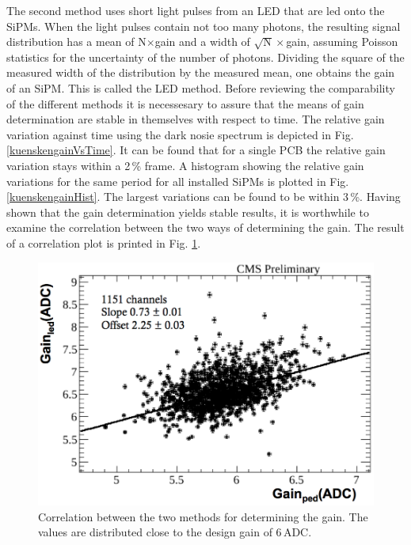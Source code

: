 The second method uses short light pulses from an LED that are led onto the SiPMs. When the light pulses contain not too many photons, the resulting signal distribution has a mean of N$\times$gain and a width of $\sqrt{\text{N}}\times$gain, assuming Poisson statistics for the uncertainty of the number of photons. Dividing the square of the measured width of the distribution by the measured mean, one obtains the gain of an SiPM. This is called the LED method.
Before reviewing the comparability of the different methods it is necessesary to assure that the means of gain determination are stable in themselves with respect to time. The relative gain variation against time using the dark nosie spectrum is depicted in Fig. \ref{kuenskengainVsTime}. It can be found that for a single PCB the relative gain variation stays within a 2\,\% frame. A histogram showing the relative gain variations for the same period for all installed SiPMs is plotted in Fig. \ref{kuenskengainHist}. The largest variations can be found to be within 3\,\%. Having shown that the gain determination yields stable results, it is worthwhile to examine the correlation between the two ways of determining the gain. The result of a correlation plot is printed in Fig. \ref{kuenskengainCorr}.
\begin{figure}[b]
\centering
\begin{minipage}[b]{0.475\textwidth}
\includegraphics[width=\textwidth]{Figures/kuensken/gainCorrelation.png}
\end{minipage}
\hspace{0.5cm}
\begin{minipage}[b]{0.475\textwidth}
\caption{Correlation between the two methods for determining the gain. The values are distributed close to the design gain of 6\,ADC.}
\label{kuenskengainCorr}
\end{minipage}
\end{figure}

